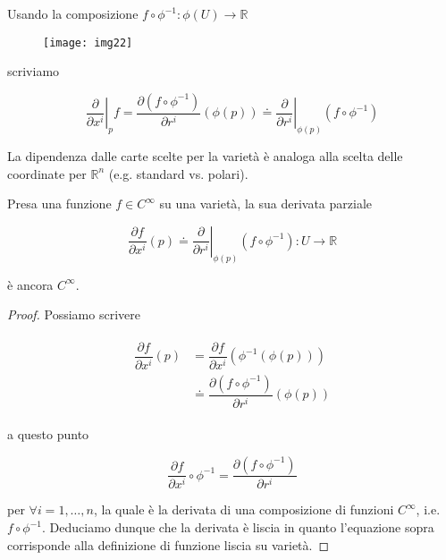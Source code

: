 Usando la composizione $ f \circ \phi^{-1} : \phi(U) \to \mathbb{R} $

\begin{figure}[H]
	\centering
	\texttt{[image: img22]}
\end{figure}

scriviamo

\begin{equation}
	\left. \dfrac{\partial}{\partial x^{i}} \right|_{p} f = \dfrac{\partial (f \circ \phi^{-1})}{\partial r^{i}} (\phi(p)) \doteq \left. \dfrac{\partial}{\partial r^{i}} \right|_{\phi(p)} (f \circ \phi^{-1})
\end{equation}

La dipendenza dalle carte scelte per la varietà è analoga alla scelta delle coordinate per $ \mathbb{R}^{n} $ (e.g. standard vs. polari).

\begin{definition}
	Presa una funzione $ f \in C^{\infty} $ su una varietà, la sua derivata parziale
	
	\begin{equation}
		\dfrac{\partial f}{\partial x^{i}} (p) \doteq \left. \dfrac{\partial}{\partial r^{i}} \right|_{\phi(p)} (f \circ \phi^{-1}) : U \to \mathbb{R}
	\end{equation}

	è ancora $ C^{\infty} $.
\end{definition}

\begin{proof}
	Possiamo scrivere
	
	\begin{align}
		\begin{split}
			\dfrac{\partial f}{\partial x^{i}} (p) &= \dfrac{\partial f}{\partial x^{i}} (\phi^{-1}(\phi(p)))\\
			&\doteq \dfrac{\partial (f \circ \phi^{-1})}{\partial r^{i}} (\phi(p))
		\end{split}
	\end{align}

	a questo punto
	
	\begin{equation}
		\dfrac{\partial f}{\partial x^{i}} \circ \phi^{-1} = \dfrac{\partial (f \circ \phi^{-1})}{\partial r^{i}}
	\end{equation}

	per $ \forall i=1,\dots,n $, la quale è la derivata di una composizione di funzioni $ C^{\infty} $, i.e. $ f \circ \phi^{-1} $. Deduciamo dunque che la derivata è liscia in quanto l'equazione sopra corrisponde alla definizione di funzione liscia su varietà.
\end{proof}

